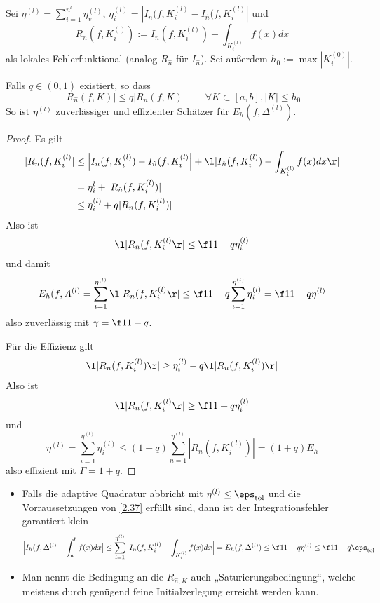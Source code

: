 \documentclass[11pt]{scrartcl}
\begin{document}
\begin{st}
	\label{2.37}
	Sei $\eta^{(l)} = \sum_{i=1}^{n^{l}} \eta_v^{(l)}$, $\eta_i^{(l)} = | I_n(f, K_i^{(l)} - I_{\hat n}(f, K_i^{(l)}|$ und
	\[
		R_n (f, K_i^{()}) := I_n(f,K_i^{(l)}) - \int_{K_i^{(l)}} f(x) dx
	\]
	als lokales Fehlerfunktional (analog $R_{\hat n}$ für $I_{\hat n}$).
	Sei außerdem $h_0 := \max |K_i^{(0)}|$.

	Falls $q \in (0,1)$ existiert, so dass
	\[
		| R_{\hat n}(f,K)| \le q |R_n(f,K)|
		\qquad \forall K\subset [a,b], |K| \le h_0
	\]
	So ist $\eta^{(l)}$ zuverlässiger und effizienter Schätzer für $E_h(f,\Delta^{(l)})$.
	\begin{proof}
		Es gilt
		\begin{align*}
			|R_n(f,K_i^{(l)}|
			&\le \Big|I_n(f,K_i^{(l)}) - I_{\hat n}(f,K_i^{(l)} \Big| + \l|I_{\hat n}(f,K_i^{(l)}) - \int_{K_i^{(l)}}f(x) dx \r| \\
			&= \eta_i^{l} + |R_{\hat n}(f,K_i^{(l)}) | \\
			&\le \eta_i^{(l)} + q |R_n(f,K_i^{(l)})|
		\end{align*}
		Also ist
		\[
			\l|R_n(f,K_i^{(l)}\r| \le \f 1{1-q} \eta_i^{(l)}
		\]
		und damit
		\begin{align*}
			E_h(f, A^{(l)} = \sum_{i=1}^{\eta^{(l)}} \l|R_n(f, K_i^{(l)} \r| \le \f 1{1-q} \sum_{i=1}^{\eta^{(l)}} \eta_i^{(l)} = \f 1{1-q} \eta^{(l)}
		\end{align*}
		also zuverlässig mit $\gamma = \f 1{1-q}$.

		Für die Effizienz gilt
		\begin{align*}
			\l|R_n(f, K_i^{(l)}) \r| 
			&\ge \eta_i^{(l)} - q \l| R_n(f, K_i^{(l)}) \r| \\
		\end{align*}
		Also ist
		\[
			\l|R_n(f, K_i^{(l)}\r| \ge \f 1{1+q} \eta_i^{(l)}
		\]
		und
		\[
			\eta^{(l)} = \sum_{i=1}^{\eta^{(l)}}{\eta_i^{(l)}} \le (1+q) \sum_{n=1}^{\eta^{(l)}} | R_n(f, K_i^{(l)}) | = (1+q) E_h
		\]
		also effizient mit $\Gamma = 1+q$.
	\end{proof}
	\begin{note}
		\begin{itemize}
			\item
				Falls die adaptive Quadratur abbricht mit $\eta^{(l)} \le \eps_{\text{tol}}$ und die Vorraussetzungen von \ref{2.37} erfüllt sind, dann ist der Integrationsfehler garantiert klein
				\[
					\Big| I_h(f,\Delta^{(l)} - \int_a^b f(x) dx \big|
					\le \sum_{i=1}^{\eta^{(l)}} \Big| I_n(f,K_i^{(l)} - \int_{K_i^{(l)}} f(x) dx \Big|
					= E_h(f,\Delta^{(l)})
					\le \f 1{1-q} \eta^{(l)}
					\le \f 1{1-q} \eps_{\text{tol}}
				\]
			\item
				Man nennt die Bedingung an die $R_{\hat n, K}$ auch „Saturierungsbedingung“, welche meistens durch genügend feine Initialzerlegung erreicht werden kann.


\end{itemize}
\end{note}
\end{st}
\end{document}
